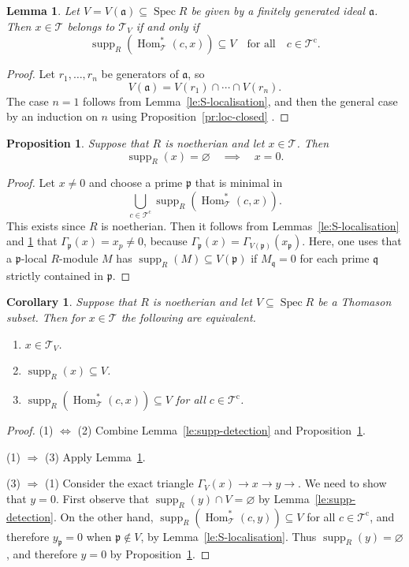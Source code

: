 \documentclass{amsart}[a4]
\newtheorem{corollary}[theorem]{Corollary}
\newtheorem{lemma}[theorem]{Lemma}
\newtheorem{proposition}[theorem]{Proposition}
\theoremstyle{definition}
\theoremstyle{remark}
\numberwithin{equation}{section}
\newcommand{\Hom}{\operatorname{Hom}}
\newcommand{\Spec}{\operatorname{Spec}}
\newcommand{\supp}{\operatorname{supp}}
\newcommand{\cat}{\mathcal}
\newcommand{\fa}{\mathfrak{a}}
\newcommand{\fp}{\mathfrak{p}}
\newcommand{\fq}{\mathfrak{q}}
\let\Gamma\varGamma
\begin{document}
\begin{lemma}\label{le:tria-supp-V(a)}
  Let $V=V(\fa)\subseteq \Spec R$ be given by a finitely generated
  ideal $\fa$. Then $x\in\cat T$ belongs to $\cat T_V$ if and only if
\[\supp_R(\Hom^*_{\cat T}(c,x))\subseteq V\quad\text{for all}\quad c\in\cat T^{\mathrm c}.\]
\end{lemma}

\begin{proof}
  Let $r_1,\ldots,r_n$ be generators of $\fa$, so
  \[V(\fa)=V(r_1)\cap\cdots\cap V(r_n).\]
  The case $n=1$ follows from Lemma~\ref{le:S-localisation}, and then
  the general case by an induction on $n$ using Proposition~\ref{pr:loc-closed} .
\end{proof}

\begin{proposition}\label{pr:noeth-supp}
  Suppose that $R$ is noetherian and let $x\in\cat T$. Then
  \[\supp_R(x)=\varnothing\quad\implies\quad x=0.\]
\end{proposition}
\begin{proof}
Let $x\neq 0$ and choose a prime $\fp$ that is minimal  in
\[\bigcup_{c\in\cat T^{\mathrm c}}\supp_R(\Hom^*_{\cat T}(c,x)).\] This exists
since $R$ is noetherian. Then it follows from
Lemmas~\ref{le:S-localisation} and \ref{le:tria-supp-V(a)} that
$\Gamma_\fp(x)=x_p\neq 0$, because
$\Gamma_\fp(x)=\Gamma_{V(\fp)}(x_\fp)$. Here, one uses that a
$\fp$-local $R$-module $M$ has $\supp_R(M)\subseteq V(\fp)$  if $M_\fq=0$ for each
prime $\fq$ strictly contained in $\fp$.
\end{proof}


\begin{corollary}
  Suppose that $R$ is noetherian and let $V\subseteq\Spec R$ be a
  Thomason subset. Then for  $x\in\cat T$ the following are
  equivalent.
  \begin{enumerate}
  \item $x\in\cat T_V$.
    \item  $\supp_R(x)\subseteq V$. 
    \item $\supp_R(\Hom^*_{\cat T}(c,x))\subseteq V$ for all $c\in\cat
      T^{\mathrm c}$.
    \end{enumerate}
\end{corollary}
\begin{proof}
  (1) $\Leftrightarrow$ (2) Combine Lemma~\ref{le:supp-detection} and
  Proposition~\ref{pr:noeth-supp}.

  (1) $\Rightarrow$ (3) Apply Lemma~\ref{le:tria-supp-V(a)}.

  (3) $\Rightarrow$ (1) Consider the exact triangle
  $\Gamma_V(x)\to x\to y\to$.  We need to show that $y=0$.  First
  observe that $\supp_R(y)\cap V=\varnothing$ by
  Lemma~\ref{le:supp-detection}. On the other hand,
  $\supp_R(\Hom^*_{\cat T}(c,y))\subseteq V$ for all
  $c\in\cat T^{\mathrm c}$, and therefore $y_\fp=0$ when
  $\fp\not\in V$, by Lemma~\ref{le:S-localisation}. Thus
  $\supp_R(y)=\varnothing$, and therefore $y= 0$ by
  Proposition~\ref{pr:noeth-supp}.
\end{proof}
\end{document}
